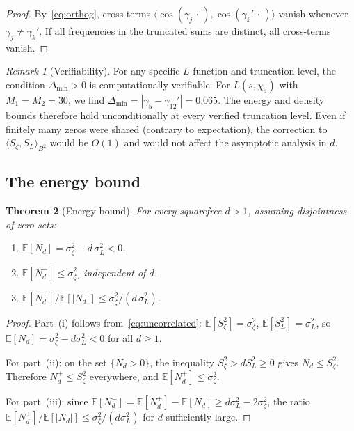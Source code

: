 \documentclass[12pt,reqno]{amsart}
\theoremstyle{plain}
\newtheorem{theorem}{Theorem}[section]
\theoremstyle{definition}
\theoremstyle{remark}
\newtheorem{remark}[theorem]{Remark}
\newcommand{\E}{\mathbb{E}}
\begin{document}
\begin{proof}
By~\eqref{eq:orthog}, cross-terms $\langle \cos(\gamma_j\,\cdot\,), \cos(\gamma_k'\,\cdot\,)\rangle$ vanish whenever $\gamma_j \neq \gamma_k'$.  If all frequencies in the truncated sums are distinct, all cross-terms vanish.
\end{proof}

\begin{remark}[Verifiability]\label{rem:shared}
For any specific $L$-function and truncation level, the condition $\Delta_{\min} > 0$ is computationally verifiable.  For $L(s,\chi_5)$ with $M_1 = M_2 = 30$, we find $\Delta_{\min} = |\gamma_5 - \gamma_{12}'| = 0.065$.  The energy and density bounds therefore hold unconditionally at every verified truncation level.  Even if finitely many zeros were shared (contrary to expectation), the correction to $\langle S_\zeta, S_L\rangle_{B^2}$ would be $O(1)$ and would not affect the asymptotic analysis in $d$.
\end{remark}


\subsection{The energy bound}

\begin{theorem}[Energy bound]\label{thm:energy}
For every squarefree $d > 1$, assuming disjointness of zero sets:
\begin{enumerate}[label=(\roman*)]
  \item $\E[N_d] = \sigma_\zeta^2 - d\,\sigma_L^2 < 0$.
  \item $\E[N_d^+] \leq \sigma_\zeta^2$, independent of $d$.
  \item $\E[N_d^+]/\E[|N_d|] \leq \sigma_\zeta^2/(d\,\sigma_L^2)$.
\end{enumerate}
\end{theorem}

\begin{proof}
Part~(i) follows from~\eqref{eq:uncorrelated}: $\E[S_\zeta^2] = \sigma_\zeta^2$, $\E[S_L^2] = \sigma_L^2$, so $\E[N_d] = \sigma_\zeta^2 - d\sigma_L^2 < 0$ for all $d \geq 1$.

For part~(ii): on the set $\{N_d > 0\}$, the inequality $S_\zeta^2 > dS_L^2 \geq 0$ gives $N_d \leq S_\zeta^2$.  Therefore $N_d^+ \leq S_\zeta^2$ everywhere, and $\E[N_d^+] \leq \sigma_\zeta^2$.

For part~(iii): since $\E[N_d^-] = \E[N_d^+] - \E[N_d] \geq d\sigma_L^2 - 2\sigma_\zeta^2$, the ratio $\E[N_d^+]/\E[|N_d|] \leq \sigma_\zeta^2/(d\sigma_L^2)$ for $d$ sufficiently large.
\end{proof}
\end{document}
